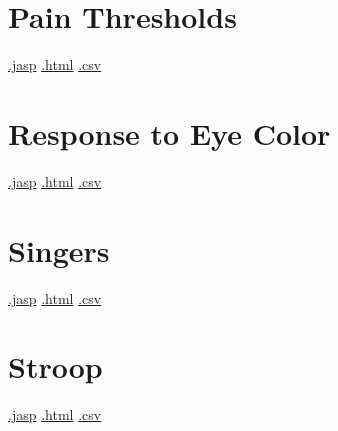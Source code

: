 \documentclass[
  letterpaper,
  DIV=11,
  numbers=noendperiod]{scrreprt}
\begin{document}
\hypertarget{pain-thresholds}{%
\section{Pain Thresholds}\label{pain-thresholds}}

\textbar{}
\href{https://github.com/jasp-stats/jasp-data-library/raw/main/Pain\%20Thresholds/Pain\%20Thresholds.jasp}{.jasp}
\textbar{}
\href{https://htmlpreview.github.io/?https://github.com/jasp-stats/jasp-data-library/blob/main/Pain\%20Thresholds/index.html}{.html}
\textbar{}
\href{https://raw.githubusercontent.com/jasp-stats/jasp-data-library/main/Pain\%20Thresholds/Pain\%20Thresholds.csv}{.csv}

\hypertarget{response-to-eye-color}{%
\section{Response to Eye Color}\label{response-to-eye-color}}

\textbar{}
\href{https://github.com/jasp-stats/jasp-data-library/raw/main/Response\%20to\%20Eye\%20Color/Response\%20to\%20Eye\%20Color.jasp}{.jasp}
\textbar{}
\href{https://htmlpreview.github.io/?https://github.com/jasp-stats/jasp-data-library/blob/main/Response\%20to\%20Eye\%20Color/index.html}{.html}
\textbar{}
\href{https://raw.githubusercontent.com/jasp-stats/jasp-data-library/main/Response\%20to\%20Eye\%20Color/Response\%20to\%20Eye\%20Color.csv}{.csv}

\hypertarget{singers}{%
\section{Singers}\label{singers}}

\textbar{}
\href{https://github.com/jasp-stats/jasp-data-library/raw/main/Singers/Singers.jasp}{.jasp}
\textbar{}
\href{https://htmlpreview.github.io/?https://github.com/jasp-stats/jasp-data-library/blob/main/Singers/index.html}{.html}
\textbar{}
\href{https://raw.githubusercontent.com/jasp-stats/jasp-data-library/main/Singers/Singers.csv}{.csv}

\hypertarget{stroop}{%
\section{Stroop}\label{stroop}}

\textbar{}
\href{https://github.com/jasp-stats/jasp-data-library/raw/main/Stroop/Stroop.jasp}{.jasp}
\textbar{}
\href{https://htmlpreview.github.io/?https://github.com/jasp-stats/jasp-data-library/blob/main/Stroop/index.html}{.html}
\textbar{}
\href{https://raw.githubusercontent.com/jasp-stats/jasp-data-library/main/Stroop/Stroop.csv}{.csv}
\end{document}
